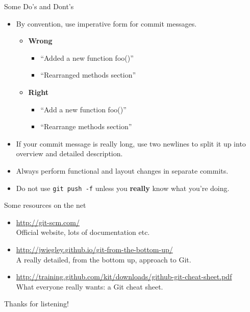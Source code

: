 \documentclass{beamer}
\begin{document}
\begin{frame}{Some Do's and Dont's}

  \begin{itemize}
  \item By convention, use imperative form for commit messages.
    \begin{itemize}
    \item \textbf{Wrong}
      \begin{itemize}
      \item ``Added a new function foo()''
      \item ``Rearranged methods section''
      \end{itemize}
    \item \textbf{Right}
      \begin{itemize}
      \item ``Add a new function foo()''
      \item ``Rearrange methods section''
      \end{itemize}
    \end{itemize}
  \item If your commit message is really long, use two newlines to
    split it up into overview and detailed description.
  \item Always perform functional and layout changes in separate
    commits.
  \item Do not use \texttt{git push -f} unless you \textbf{really}
    know what you're doing.
  \end{itemize}

\end{frame}

\begin{frame}{Some resources on the net}

  \begin{itemize}
  \item \url{http://git-scm.com/} \\Official website, lots of
    documentation etc.
  \item \url{http://jwiegley.github.io/git-from-the-bottom-up/} \\A
    really detailed, from the bottom up, approach to Git.
  \item \url{http://training.github.com/kit/downloads/github-git-cheat-sheet.pdf}
    \\What everyone really wants: a Git cheat sheet.
  \end{itemize}
\end{frame}

\begin{frame}{Thanks for listening!}


\end{frame}
\end{document}
